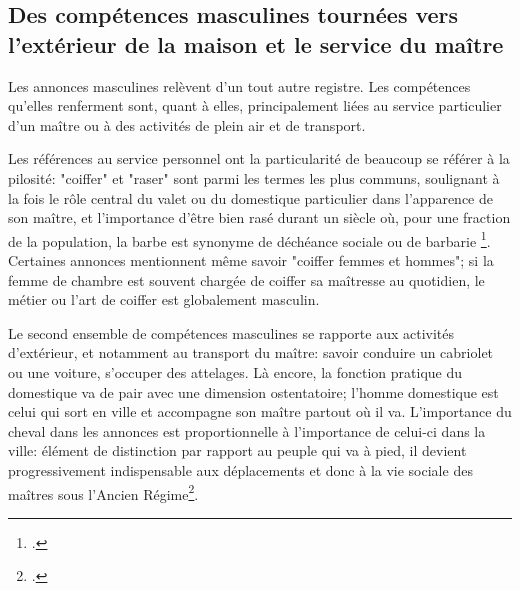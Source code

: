 \subsection{Des compétences masculines tournées vers l'extérieur de la maison et le service du maître}

Les annonces masculines relèvent d'un tout autre registre. Les compétences qu'elles renferment sont, quant à elles, principalement liées au service particulier d'un maître ou à des activités de plein air et de transport. 

Les références au service personnel ont la particularité de beaucoup se référer à la pilosité: "coiffer" et "raser" sont parmi les termes les plus communs, soulignant à la fois le rôle central du valet ou du domestique particulier dans l'apparence de son maître, et l'importance d'être bien rasé durant un siècle où, pour une fraction de la population, la barbe est synonyme de déchéance sociale ou de barbarie \footcites{auzepyHistoirePoil2017}. Certaines annonces mentionnent même savoir "coiffer femmes et hommes"; si la femme de chambre est souvent chargée de coiffer sa maîtresse au quotidien, le métier ou l'art de coiffer est globalement masculin. 

Le second ensemble de compétences masculines se rapporte aux activités d'extérieur, et notamment au transport du maître: savoir conduire un cabriolet ou une voiture, s'occuper des attelages. Là encore, la fonction pratique du domestique va de pair avec une dimension ostentatoire; l'homme domestique est celui qui sort en ville et accompagne son maître partout où il va. L'importance du cheval dans les annonces est proportionnelle à l'importance de celui-ci dans la ville: élément de distinction par rapport au peuple qui va à pied, il devient progressivement indispensable aux déplacements et donc à la vie sociale des maîtres sous l'Ancien Régime\footcites{rocheCultureEquestreOccidentale2008}. 


